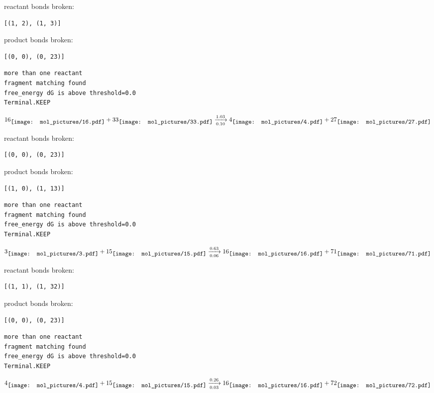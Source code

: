 \documentclass{article}
\begin{document}
reactant bonds broken:\begin{verbatim}
[(1, 2), (1, 3)]
\end{verbatim}
product bonds broken:\begin{verbatim}
[(0, 0), (0, 23)]
\end{verbatim}




\vspace{1cm}
\begin{verbatim}
more than one reactant
fragment matching found
free_energy dG is above threshold=0.0
Terminal.KEEP
\end{verbatim}
$$
16
\raisebox{-.5\height}{\texttt{[image: mol\_pictures/16.pdf]}}
+
33
\raisebox{-.5\height}{\texttt{[image: mol\_pictures/33.pdf]}}
\xrightarrow[0.10]{1.03}
4
\raisebox{-.5\height}{\texttt{[image: mol\_pictures/4.pdf]}}
+
27
\raisebox{-.5\height}{\texttt{[image: mol\_pictures/27.pdf]}}
$$


reactant bonds broken:\begin{verbatim}
[(0, 0), (0, 23)]
\end{verbatim}
product bonds broken:\begin{verbatim}
[(1, 0), (1, 13)]
\end{verbatim}




\vspace{1cm}
\begin{verbatim}
more than one reactant
fragment matching found
free_energy dG is above threshold=0.0
Terminal.KEEP
\end{verbatim}
$$
3
\raisebox{-.5\height}{\texttt{[image: mol\_pictures/3.pdf]}}
+
15
\raisebox{-.5\height}{\texttt{[image: mol\_pictures/15.pdf]}}
\xrightarrow[0.06]{0.63}
16
\raisebox{-.5\height}{\texttt{[image: mol\_pictures/16.pdf]}}
+
71
\raisebox{-.5\height}{\texttt{[image: mol\_pictures/71.pdf]}}
$$


reactant bonds broken:\begin{verbatim}
[(1, 1), (1, 32)]
\end{verbatim}
product bonds broken:\begin{verbatim}
[(0, 0), (0, 23)]
\end{verbatim}




\vspace{1cm}
\begin{verbatim}
more than one reactant
fragment matching found
free_energy dG is above threshold=0.0
Terminal.KEEP
\end{verbatim}
$$
4
\raisebox{-.5\height}{\texttt{[image: mol\_pictures/4.pdf]}}
+
15
\raisebox{-.5\height}{\texttt{[image: mol\_pictures/15.pdf]}}
\xrightarrow[0.03]{0.26}
16
\raisebox{-.5\height}{\texttt{[image: mol\_pictures/16.pdf]}}
+
72
\raisebox{-.5\height}{\texttt{[image: mol\_pictures/72.pdf]}}
$$
\end{document}

